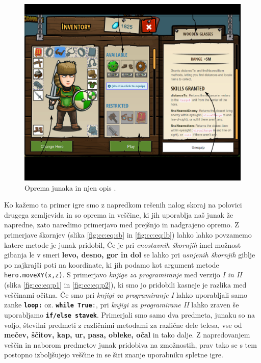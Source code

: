\begin{figure}[h!]
  \centering
    \includegraphics [width=0.55\linewidth, keepaspectratio =
   1] {./images/sc_web/cc_izbor-zem-EQ-v01.jpg}
   \caption{Oprema junaka in njen opis \cite{web:codecombat}.}
   \label{fig:web:cc:zemljevid:EQ}
 \end{figure}
 
 Ko kažemo ta primer igre smo z napredkom rešenih nalog skoraj na
 polovici drugega zemljevida in so oprema in veščine, ki jih uporablja
 naš junak že napredne, zato naredimo primerjavo med prejšnjo in
 nadgrajeno opremo. Z primerjave škornjev (slika \ref{fig:cc:eq:sb} in
 \ref{fig:cc:eq:lb}) lahko lahko povzamemo katere metode je junak
 pridobil, Če je pri \emph{enostavnih škornjih} imel možnost gibanja
 le v smeri \textbf{levo, desno, gor in dol} se lahko pri
 \emph{usnjenih škornjih} giblje po najkrajši poti na koordinate, ki
 jih podamo kot argument metode \texttt{hero.moveXY(x,z)}. S
 primerjavo \emph{knjige za programiranje} med verzijo \emph{I in II}
 (slika \ref{fig:cc:eq:p1} in \ref{fig:cc:eq:p2}), ki smo jo pridobili
 kasneje je razlika med veščinami očitna. Če smo pri \emph{knjigi za
   programiranje I} lahko uporabljali samo zanke
 \texttt{\textbf{loop:}} oz. \texttt{\textbf{while True}:}, pri
 \emph{knjigi za programirane II} lahko zraven še uporabljamo
 \texttt{\textbf{if/else stavek}}. Primerjali smo samo dva predmeta,
 junaku so na voljo, številni predmeti z različnimi metodami za
 različne dele telesa, vse od \textbf{mečev, ščitov, kap, ur, pasa,
   obleke, očal} in tako dalje. Z napredovanjem veščin in naborom
 predmetov junak pridobiva na zmožnostih, prav tako se s tem postopno
 izboljšujejo veščine in se širi znanje uporabniku spletne igre.

